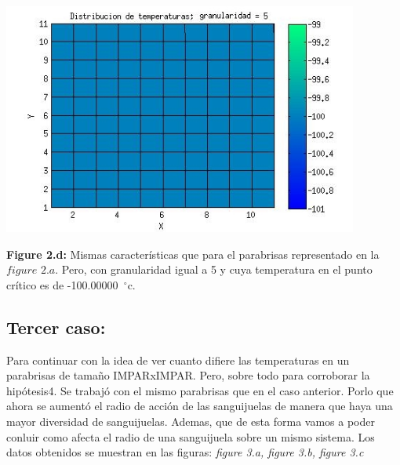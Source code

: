 \documentclass[a4paper]{article}
\begin{document}
\includegraphics[width=\textwidth,height=3.0in,keepaspectratio
]{45x45h5.jpg} \newline
\begin {flushleft}
\textbf{Figure 2.d:} Mismas características que para el parabrisas representado en la $figure$ $2.a$. Pero, con granularidad igual a 5 y cuya temperatura en el punto crítico es de -100.00000\hspace{-1.5mm}$\phantom{a}^{\circ}$c.
\end{flushleft}


\subsection{Tercer caso:}


Para continuar con la idea de ver cuanto difiere las temperaturas en un parabrisas de tamaño IMPARxIMPAR. Pero, sobre todo para corroborar la hipótesis4. Se trabajó con el mismo parabrisas que en el caso anterior. Porlo que ahora se aumentó el radio de acción de las sanguijuelas de manera que haya una mayor diversidad de sanguijuelas. Ademas, que de esta forma vamos a poder conluir como afecta el radio de una sanguijuela sobre un mismo sistema. Los datos obtenidos se muestran en las figuras: \textit{figure 3.a, figure 3.b, figure 3.c}  \newline
\end{document}
